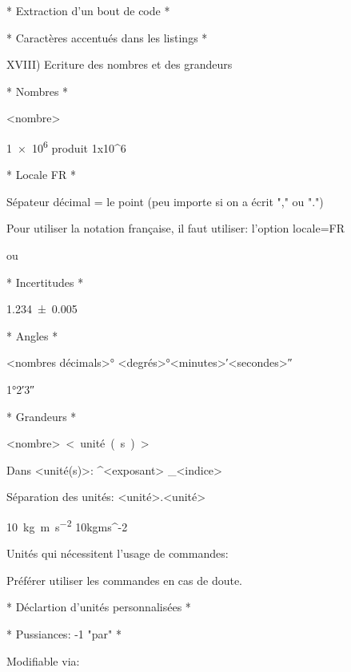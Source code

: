* Extraction d'un bout de code *



* Caractères accentués dans les listings *

\usepackage{listingsutf8}
\lstset{%
	inputencoding=utf8/latin1,
	<autres options>
}

XVIII) Ecriture des nombres et des grandeurs

\usepackage{siunitx}

* Nombres *

\num[<options>]{<nombre>}

\num{1e6} produit 1x10^6

* Locale FR *

Sépateur décimal = le point (peu importe si on a écrit "," ou ".")

Pour utiliser la notation française, il faut utiliser:
l'option locale=FR

\usepackage[<options>]{siunitx}
ou

* Incertitudes *

\num{1.234(5)} %

* Angles *

\ang[<options>]{<nombres décimals>}
\ang[<options>]{<degrés>;<minutes>;<secondes>}

\ang{1;2;3} %

* Grandeurs *


\SI[<options>]{<nombre>}{<unité(s)>}

Dans <unité(s)>:
	^{<exposant>}
	_{<indice>}

Séparation des unités:
	<unité>.<unité>

\SI{10}{kg.m.s^{-2}} 10kgms^-2

Unités qui nécessitent l'usage de commandes:
\planckbar
\angstrom
\ohm
\celsius
\micro\gram

Préférer utiliser les commandes en cas de doute.

* Déclartion d'unités personnalisées *


\DeclareSIUnit{\kmh}{\km\per\hour}
\newcommand{\vit}[1]{\SI{#1}{\kmh}} %

* Pussiances: -1 "par" *
\per

Modifiable via: 

